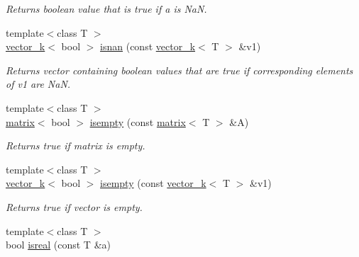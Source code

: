 \begin{DoxyCompactItemize}
\begin{DoxyCompactList}\small\item\em Returns boolean value that is true if a is Na\-N. \end{DoxyCompactList}\item 
\hypertarget{namespacekeycpp_ac54a98797b243f8f8b13b897cdeeba1c}{{\footnotesize template$<$class T $>$ }\\\hyperlink{classkeycpp_1_1vector__k}{vector\-\_\-k}$<$ bool $>$ \hyperlink{namespacekeycpp_ac54a98797b243f8f8b13b897cdeeba1c}{isnan} (const \hyperlink{classkeycpp_1_1vector__k}{vector\-\_\-k}$<$ T $>$ \&v1)}\label{namespacekeycpp_ac54a98797b243f8f8b13b897cdeeba1c}

\begin{DoxyCompactList}\small\item\em Returns vector containing boolean values that are true if corresponding elements of v1 are Na\-N. \end{DoxyCompactList}\item 
\hypertarget{namespacekeycpp_acc2de8926c54a2048a0d8965e7d70995}{{\footnotesize template$<$class T $>$ }\\\hyperlink{classkeycpp_1_1matrix}{matrix}$<$ bool $>$ \hyperlink{namespacekeycpp_acc2de8926c54a2048a0d8965e7d70995}{isempty} (const \hyperlink{classkeycpp_1_1matrix}{matrix}$<$ T $>$ \&A)}\label{namespacekeycpp_acc2de8926c54a2048a0d8965e7d70995}

\begin{DoxyCompactList}\small\item\em Returns true if matrix is empty. \end{DoxyCompactList}\item 
\hypertarget{namespacekeycpp_aef3406643c82187b13c5ab0b6da788b6}{{\footnotesize template$<$class T $>$ }\\\hyperlink{classkeycpp_1_1vector__k}{vector\-\_\-k}$<$ bool $>$ \hyperlink{namespacekeycpp_aef3406643c82187b13c5ab0b6da788b6}{isempty} (const \hyperlink{classkeycpp_1_1vector__k}{vector\-\_\-k}$<$ T $>$ \&v1)}\label{namespacekeycpp_aef3406643c82187b13c5ab0b6da788b6}

\begin{DoxyCompactList}\small\item\em Returns true if vector is empty. \end{DoxyCompactList}\item 
\hypertarget{namespacekeycpp_a81a8c955cdbeb60181f6bf7d6553ac53}{{\footnotesize template$<$class T $>$ }\\bool \hyperlink{namespacekeycpp_a81a8c955cdbeb60181f6bf7d6553ac53}{isreal} (const T \&a)}\label{namespacekeycpp_a81a8c955cdbeb60181f6bf7d6553ac53}


\end{DoxyCompactItemize}
